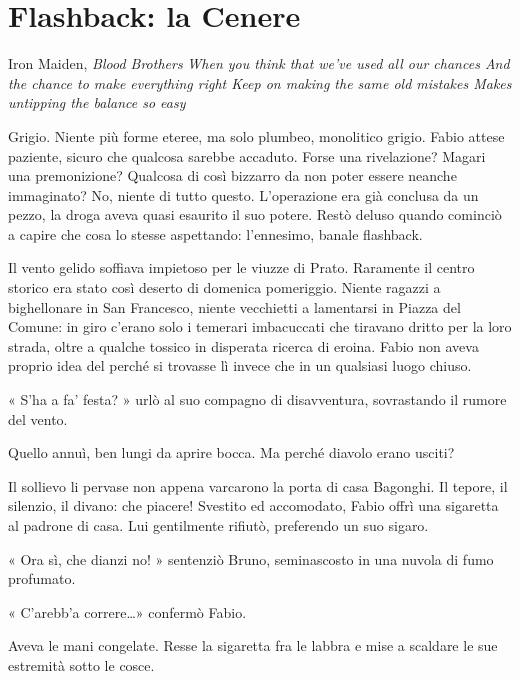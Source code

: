 \chapter{Flashback: la Cenere}

\begin{chapquote}{Iron Maiden, \textit{Blood Brothers}}
	\textit{When you think that we've used all our chances\newline
		And the chance to make everything right\newline
		Keep on making the same old mistakes\newline
		Makes untipping the balance so easy
	}
\end{chapquote}


Grigio. Niente più forme eteree, ma solo plumbeo, monolitico grigio. Fabio attese paziente, sicuro che qualcosa sarebbe accaduto. Forse una rivelazione? Magari una premonizione? Qualcosa di così bizzarro da non poter essere neanche immaginato? No, niente di tutto questo. L'operazione era già conclusa da un pezzo, la droga aveva quasi esaurito il suo potere. Restò deluso quando cominciò a capire che cosa lo stesse aspettando: l'ennesimo, banale flashback.

Il vento gelido soffiava impietoso per le viuzze di Prato. Raramente il centro storico era stato così deserto di domenica pomeriggio. Niente ragazzi a bighellonare in San Francesco, niente vecchietti a lamentarsi in Piazza del Comune: in giro c'erano solo i temerari imbacuccati che tiravano dritto per la loro strada, oltre a qualche tossico in disperata ricerca di eroina. Fabio non aveva proprio idea del perché si trovasse lì invece che in un qualsiasi luogo chiuso.

« S'ha a fa' festa? » urlò al suo compagno di disavventura, sovrastando il rumore del vento.

Quello annuì, ben lungi da aprire bocca. Ma perché diavolo erano usciti?

Il sollievo li pervase non appena varcarono la porta di casa Bagonghi. Il tepore, il silenzio, il divano: che piacere! Svestito ed accomodato, Fabio offrì una sigaretta al padrone di casa. Lui gentilmente rifiutò, preferendo un suo sigaro.

« Ora sì, che dianzi no! » sentenziò Bruno, seminascosto in una nuvola di fumo profumato.

« C'arebb'a correre\ldots» confermò Fabio.

Aveva le mani congelate. Resse la sigaretta fra le labbra e mise a scaldare le sue estremità sotto le cosce.

